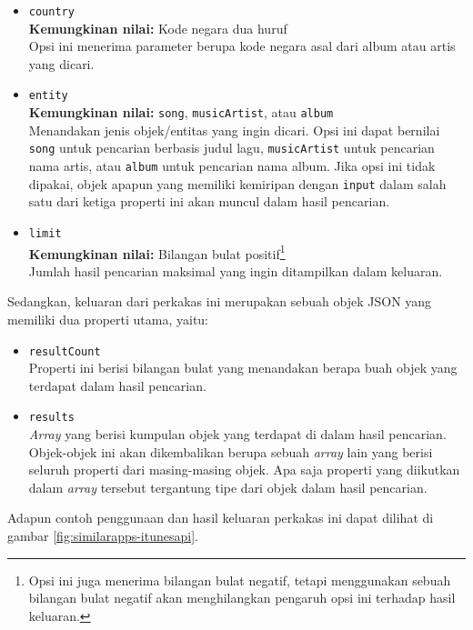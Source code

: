 \documentclass[a4paper,twoside]{article}
\begin{document}
\begin{enumerate}
\begin{itemize}
	\item \verb|country|\\
	\textbf{Kemungkinan nilai:} Kode negara dua huruf\\
	Opsi ini menerima parameter berupa kode negara asal dari album atau artis yang dicari.
	\item \verb|entity|\\
	\textbf{Kemungkinan nilai:} \verb|song|, \verb|musicArtist|, atau \verb|album|\\
	Menandakan jenis objek/entitas yang ingin dicari. Opsi ini dapat bernilai \verb|song| untuk pencarian berbasis judul lagu, \verb|musicArtist| untuk pencarian nama artis, atau \verb|album| untuk pencarian nama album. Jika opsi ini tidak dipakai, objek apapun yang memiliki kemiripan dengan \verb|input| dalam salah satu dari ketiga properti ini akan muncul dalam hasil pencarian.
	\item \verb|limit|\\
	\textbf{Kemungkinan nilai:} Bilangan bulat positif\footnote{Opsi ini juga menerima bilangan bulat negatif, tetapi menggunakan sebuah bilangan bulat negatif akan menghilangkan pengaruh opsi ini terhadap hasil keluaran.}\\
	Jumlah hasil pencarian maksimal yang ingin ditampilkan dalam keluaran.
\end{itemize}

Sedangkan, keluaran dari perkakas ini merupakan sebuah objek JSON yang memiliki dua properti utama, yaitu:

\begin{itemize}
	\item \verb|resultCount|\\
	Properti ini berisi bilangan bulat yang menandakan berapa buah objek yang terdapat dalam hasil pencarian.
	\item \verb|results|\\
	\textit{Array} yang berisi kumpulan objek yang terdapat di dalam hasil pencarian. Objek-objek ini akan dikembalikan berupa sebuah \textit{array} lain yang berisi seluruh properti dari masing-masing objek. Apa saja properti yang diikutkan dalam \textit{array} tersebut tergantung tipe dari objek dalam hasil pencarian.
\end{itemize}

Adapun contoh penggunaan dan hasil keluaran perkakas ini dapat dilihat di gambar \ref{fig:similarapps-itunesapi}.


\end{enumerate}
\end{document}
